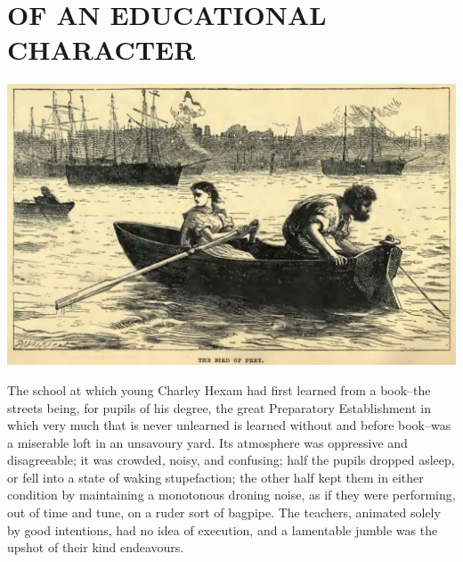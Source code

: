 
\chapter{OF AN EDUCATIONAL CHARACTER}

\includegraphics[scale=2.3]{01-01-01}

The school at which young Charley Hexam had first learned from a
book--the streets being, for pupils of his degree, the great Preparatory
Establishment in which very much that is never unlearned is learned
without and before book--was a miserable loft in an unsavoury yard. Its
atmosphere was oppressive and disagreeable; it was crowded, noisy,
and confusing; half the pupils dropped asleep, or fell into a state of
waking stupefaction; the other half kept them in either condition by
maintaining a monotonous droning noise, as if they were performing, out
of time and tune, on a ruder sort of bagpipe. The teachers, animated
solely by good intentions, had no idea of execution, and a lamentable
jumble was the upshot of their kind endeavours.

